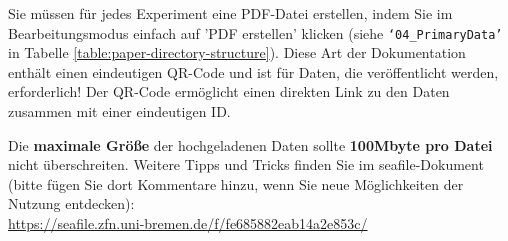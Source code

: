Sie müssen für jedes Experiment eine PDF-Datei erstellen, indem Sie im Bearbeitungsmodus einfach auf 'PDF erstellen' klicken (siehe
\texttt{‘04\_PrimaryData’} in Tabelle \ref{table:paper-directory-structure}).
Diese Art der Dokumentation enthält einen eindeutigen QR-Code und ist für Daten,
die veröffentlicht werden, erforderlich! Der QR-Code ermöglicht einen direkten
Link zu den Daten zusammen mit einer eindeutigen ID.

Die \textbf{maximale Größe} der hochgeladenen Daten sollte \textbf{100Mbyte pro
Datei} nicht überschreiten. Weitere Tipps und Tricks finden Sie im
seafile-Dokument (bitte fügen Sie dort Kommentare hinzu, wenn Sie neue
Möglichkeiten der Nutzung entdecken): \\
\url{https://seafile.zfn.uni-bremen.de/f/fe685882eab14a2e853c/}
